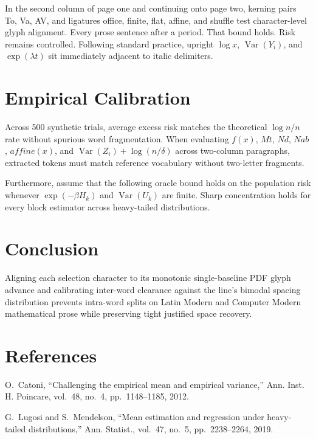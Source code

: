 \documentclass[10pt,twocolumn]{article}
\newcommand{\lmitalic}[1]{{\lmit #1}}
\begin{document}
In the second column of page one and continuing onto page two, kerning pairs To, Va, AV, and ligatures office, finite, flat, affine, and shuffle test character-level glyph alignment. Every prose sentence after a period. That bound holds. Risk remains controlled. Following standard practice, upright $\log x$, $\operatorname{Var}(Y_i)$, and $\exp(\lambda t)$ sit immediately adjacent to italic delimiters.

\clearpage

\section{Empirical Calibration}
Across 500 synthetic trials, average excess risk matches the theoretical $\log n / n$ rate without spurious word fragmentation. When evaluating $f(x)$, $Mt$, $Nd$, $Nab$, $affine(x)$, and $\operatorname{Var}(Z_i) + \log(n/\delta)$ across two-column paragraphs, extracted tokens must match reference vocabulary without two-letter fragments.

Furthermore, \lmitalic{assume that the following oracle bound holds on the population risk} whenever $\exp(-\beta H_k)$ and $\operatorname{Var}(U_k)$ are finite. Sharp concentration holds for every block estimator across heavy-tailed distributions.

\newpage

\section{Conclusion}
Aligning each selection character to its monotonic single-baseline PDF glyph advance and calibrating inter-word clearance against the line's bimodal spacing distribution prevents intra-word splits on Latin Modern and Computer Modern mathematical prose while preserving tight justified space recovery.

\section{References}
\noindent [1] O.~Catoni, ``Challenging the empirical mean and empirical variance,'' \lmitalic{Ann. Inst. H. Poincare}, vol.~48, no.~4, pp.~1148--1185, 2012.\par\smallskip
\noindent [2] G.~Lugosi and S.~Mendelson, ``Mean estimation and regression under heavy-tailed distributions,'' \lmitalic{Ann. Statist.}, vol.~47, no.~5, pp.~2238--2264, 2019.\par
\end{document}
